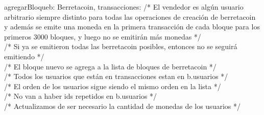 \documentclass[10pt,a4paper]{article}
\begin{document}
\begin{tcolorbox}
\begin{proc}{agregarBloque}{\Inout b: Berretacoin, \In transacciones: }{}
            \textcolor{babyblue}{/* El vendedor es algún usuario arbitrario siempre distinto para todas las operaciones de creación de berretacoin y además se emite una moneda en la primera transacción de cada bloque para los primeros 3000 bloques, y luego no se emitirán más monedas */} \\
            \textcolor{babyblue}{/* Si ya se emitieron todas las berretacoin posibles, entonces no se seguirá emitiendo */} \\
            \textcolor{babyblue}{/* El bloque nuevo se agrega a la lista de bloques de berretacoin */} \\
            \textcolor{babyblue}{/* Todos los usuarios que están en transacciones estan en b.usuarios */} \\
            \textcolor{babyblue}{/* El orden de los usuarios sigue siendo el mismo orden en la lista */} \\
            \textcolor{babyblue}{/* No van a haber ids repetidos en b.usuarios */} \\
            \textcolor{babyblue}{/* Actualizamos de ser necesario la cantidad de monedas de los usuarios */} \\

\end{proc}
\end{tcolorbox}
\end{document}
